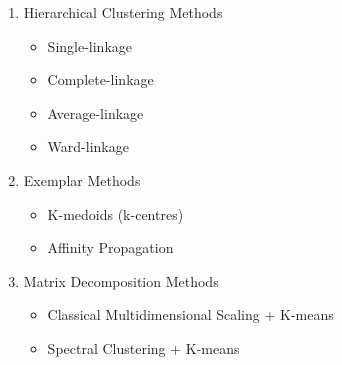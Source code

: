 \documentclass[11pt]{article}
\begin{document}
\begin{enumerate}
	\item Hierarchical Clustering Methods
	\begin{itemize}
		\item Single-linkage
		\item Complete-linkage
		\item Average-linkage
		\item Ward-linkage
	\end{itemize}
	\item Exemplar Methods
	\begin{itemize}
		\item K-medoids (k-centres)
		\item Affinity Propagation
	\end{itemize}
	\item Matrix Decomposition Methods
	\begin{itemize}
		\item Classical Multidimensional Scaling + K-means
		\item Spectral Clustering + K-means
	\end{itemize}
\end{enumerate}

\end{document}
